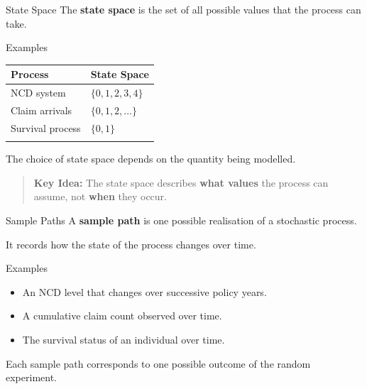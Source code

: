 \documentclass[
  ignorenonframetext,
  aspectratio=169,
]{beamer}
\newcounter{none} %
\providecommand{\tightlist}{%
  \setlength{\itemsep}{0pt}\setlength{\parskip}{0pt}}
\begin{document}
\begin{frame}{State Space}
\protect{}\label{state-space}
The \textbf{state space} is the set of all possible values that the
process can take.

Examples

{\def\LTcaptype{none} %
\begin{longtable}[]{@{}ll@{}}
\toprule\noalign{}
Process & State Space \\
\midrule\noalign{}
\endhead
NCD system & \(\{0,1,2,3,4\}\) \\
Claim arrivals & \(\{0,1,2,\ldots\}\) \\
Survival process & \(\{0,1\}\) \\
\bottomrule\noalign{}
\end{longtable}
}

The choice of state space depends on the quantity being modelled.

\begin{quote}
\textbf{Key Idea:} The state space describes \textbf{what values} the
process can assume, not \textbf{when} they occur.
\end{quote}
\end{frame}

\begin{frame}{Sample Paths}
\protect{}\label{sample-paths}
A \textbf{sample path} is one possible realisation of a stochastic
process.

It records how the state of the process changes over time.

Examples

\begin{itemize}
\tightlist
\item
  An NCD level that changes over successive policy years.
\item
  A cumulative claim count observed over time.
\item
  The survival status of an individual over time.
\end{itemize}

Each sample path corresponds to one possible outcome of the random
experiment.
\end{frame}
\end{document}
